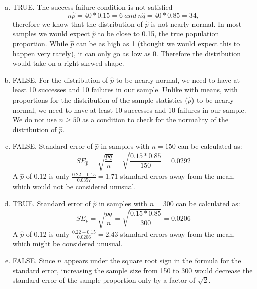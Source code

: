 %

{
{
\begin{enumerate}[(a)]
\item TRUE. The success-failure condition is not satisfied
\[ n\hat{p} = 40 * 0.15 = 6~and~ n\hat{q} = 40 * 0.85 = 34, \]
therefore we know that the distribution of $\hat{p}$ is not nearly normal. In most samples we would expect $\hat{p}$ to be close to 0.15, the true population proportion. While $\hat{p}$ can be as high as 1 (thought we would expect this to happen very rarely), it can only go as low as 0. Therefore the distribution would take on a right skewed shape.
\item FALSE. For the distribution of $\hat{p}$ to be nearly normal, we need to have at least 10 successes and 10 failures in our sample. Unlike with means, with proportions for the distribution of the sample statistics ($\hat{p}$) to be nearly normal, we need to have at least 10 successes and 10 failures in our sample. We do not use $n \ge 50$ as a condition to check for the normality of the distribution of $\hat{p}$.
\item FALSE. Standard error of $\hat{p}$ in samples with $n = 150$ can be calculated as:
\[SE_{\hat{p}} = \sqrt{ \frac{pq}{n} } = \sqrt{\frac{0.15 * 0.85}{150}} = 0.0292 \]
A $\hat{p}$ of 0.12 is only $\frac{0.22 - 0.15}{0.0357} = 1.71$ standard errors away from the mean, which would not be considered unusual.
\item TRUE. Standard error of $\hat{p}$ in samples with $n = 300$ can be calculated as:
\[SE_{\hat{p}} = \sqrt{ \frac{pq}{n} } = \sqrt{\frac{0.15 * 0.85}{300}} = 0.0206 \]
A $\hat{p}$ of 0.12 is only $\frac{0.22 - 0.15}{0.0206} = 2.43$ standard errors away from the mean, which might be considered unusual.
\item FALSE. Since $n$ appears under the square root sign in the formula for the standard error, increasing the sample size from 150 to 300 would decrease the standard error of the sample proportion only by a factor of $\sqrt{2}$.
\end{enumerate}
}
}

